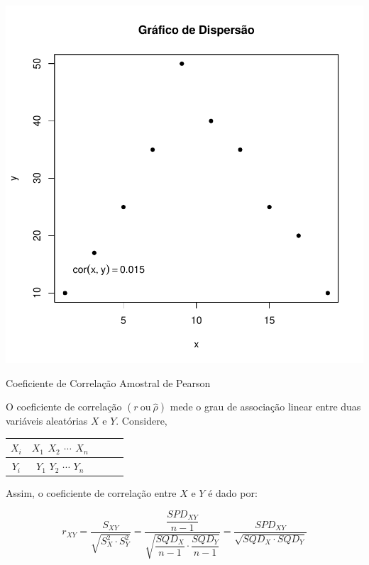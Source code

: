 \documentclass[14pt,aspectratio=1610]{beamer}
\begin{document}
\begin{frame}[fragile]{}
\begin{center}
\includegraphics{Aula3-006}
\end{center}
\end{frame}

\begin{frame}{Coeficiente de Correlação Amostral de Pearson}
    \begin{block}{}
    \justifying
    O coeficiente de correlação $(r\ \textrm{ou}\ \hat{\rho})$ mede o grau de associação linear entre duas variáveis aleatórias $X$ e $Y.$ Considere,
    \begin{table}[H]
        \centering
        \begin{tabular}{c|cccc}
             $X_{i}$&$X_{1}$ $X_{2}$ $\cdots$ $X_{n}$ \\
             \hline
             $Y_{i}$&$Y_{1}$ $Y_{2}$ $\cdots$ $Y_{n}$ 
        \end{tabular}
    \end{table}
    Assim, o coeficiente de correlação entre $X$ e $Y$ é dado por:
    
    $$r_{XY}=\dfrac{S_{XY}}{\sqrt{S^{2}_{X}\cdot S_{Y}^{2}}}=
    \dfrac{\dfrac{SPD_{XY}}{n-1}}{\sqrt{\dfrac{SQD_{X}}{n-1}\cdot\dfrac{SQD_{Y}}{n-1}}}= 
    \dfrac{SPD_{XY}}{\sqrt{SQD_{X}\cdot SQD_{Y}}}$$
    
    \end{block}
\end{frame}
\end{document}
